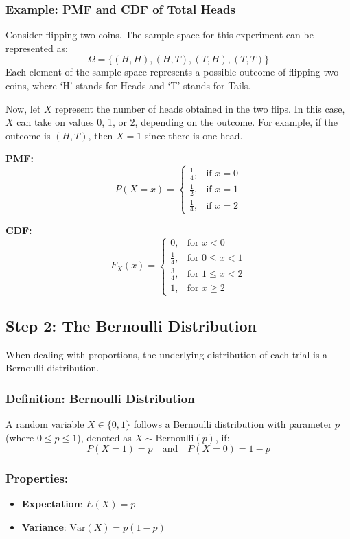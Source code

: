 \documentclass[11pt]{article}
\begin{document}
\subsubsection*{Example: PMF and CDF of Total Heads}

Consider flipping two coins. The sample space for this experiment can be represented as:
\[
\Omega = \{ (H, H), (H, T), (T, H), (T, T) \}
\]
Each element of the sample space represents a possible outcome of flipping two coins, where `H' stands for Heads and `T' stands for Tails.

Now, let \( X \) represent the number of heads obtained in the two flips. In this case, \( X \) can take on values 0, 1, or 2, depending on the outcome. For example, if the outcome is \((H, T)\), then \( X = 1 \) since there is one head.

\textbf{PMF:}
\[
P(X = x) = 
\begin{cases}
    \frac{1}{4}, & \text{if } x = 0 \\
    \frac{1}{2}, & \text{if } x = 1 \\
    \frac{1}{4}, & \text{if } x = 2
\end{cases}
\]

\textbf{CDF:}
\[
F_X(x) = 
\begin{cases}
    0, & \text{for } x < 0 \\
    \frac{1}{4}, & \text{for } 0 \leq x < 1 \\
    \frac{3}{4}, & \text{for } 1 \leq x < 2 \\
    1, & \text{for } x \geq 2
\end{cases}
\]


\subsection*{Step 2: The Bernoulli Distribution}

When dealing with proportions, the underlying distribution of each trial is a Bernoulli distribution.

\subsubsection*{Definition: Bernoulli Distribution}
A random variable \(X \in \{0,1\}\) follows a Bernoulli distribution with parameter \(p\) (where \(0 \leq p \leq 1\)), denoted as \(X \sim \text{Bernoulli}(p)\), if:
\[ P(X = 1) = p \quad \text{and} \quad P(X = 0) = 1 - p \]

\subsubsection*{Properties:}
\begin{itemize}
    \item \textbf{Expectation}: \(E(X) = p\)
    \item \textbf{Variance}: \(\text{Var}(X) = p(1-p)\)
\end{itemize}
\end{document}
